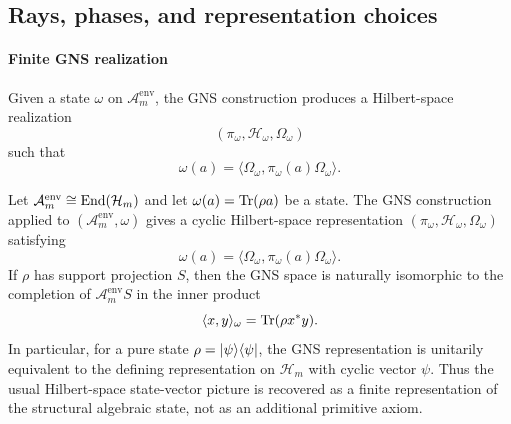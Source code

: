\documentclass[12pt,a4paper]{article}
\begin{document}
\subsection{Rays, phases, and representation choices}
\label{p4:sec:part2-rays}



\paragraph{Finite GNS realization}
\label{p4:sec:part2-gns}

Given a state $\omega$ on $\mathcal A_m^{\mathrm{env}}$, the GNS construction produces a Hilbert-space realization \cite{GelfandNaimark1943,Segal1947,BratteliRobinson1987}
\begin{equation}
\label{p4:eq:gns}
(\pi_\omega,\mathcal H_\omega,\Omega_\omega)
\end{equation}
such that
\begin{equation}
\label{p4:eq:gns-state}
\omega(a)=\langle\Omega_\omega,\pi_\omega(a)\Omega_\omega\rangle.
\end{equation}


\begin{proposition}
\label{p4:prop:finite-gns-density}
Let \(\mathcal A_m^{\mathrm{env}}\cong \operatorname{End}(\mathcal H_m)\) and let \(\omega(a)=\operatorname{Tr}(\rho a)\) be a state.  The GNS construction applied to \((\mathcal A_m^{\mathrm{env}},\omega)\) gives a cyclic Hilbert-space representation \((\pi_\omega,\mathcal H_\omega,\Omega_\omega)\) satisfying
\[
\omega(a)=\langle\Omega_\omega,\pi_\omega(a)\Omega_\omega\rangle .
\]
If \(\rho\) has support projection \(S\), then the GNS space is naturally isomorphic to the completion of \(\mathcal A_m^{\mathrm{env}}S\) in the inner product
\[
\langle x,y\rangle_\omega=\operatorname{Tr}(\rho x^*y).
\]
In particular, for a pure state \(\rho=\lvert \psi \rangle\langle \psi \rvert\), the GNS representation is unitarily equivalent to the defining representation on \(\mathcal H_m\) with cyclic vector \(\psi\).  Thus the usual Hilbert-space state-vector picture is recovered as a finite representation of the structural algebraic state, not as an additional primitive axiom.
\end{proposition}
\end{document}
